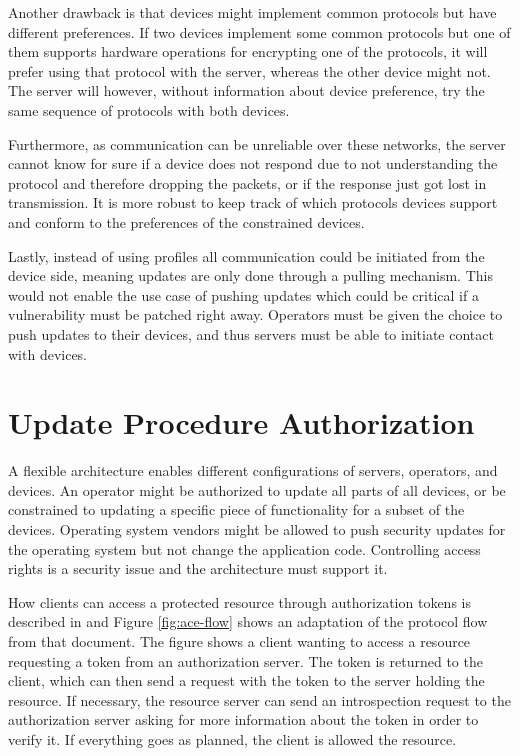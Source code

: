 \documentclass[0-thesis.tex]{subfiles}
\begin{document}
Another drawback is that devices might implement common protocols but have different
preferences. If two devices implement some common protocols but one of them supports
hardware operations for encrypting one of the protocols, it will prefer using that
protocol with the server, whereas the other device might not. The server will however,
without information about device preference, try the same sequence of protocols with both
devices.

Furthermore, as communication can be unreliable over these networks, the server
cannot know for sure if a device does not respond due to not understanding the protocol
and therefore dropping the packets, or if the response just got lost in transmission. It
is more robust to keep track of which protocols devices support and conform to the
preferences of the constrained devices.

Lastly, instead of using profiles all communication could be initiated from the device
side, meaning updates are only done through a pulling mechanism. This would not enable the
use case of pushing updates which could be critical if a vulnerability must be patched
right away. Operators must be given the choice to push updates to their devices, and thus
servers must be able to initiate contact with devices.

\section{Update Procedure Authorization}
\label{sec:authorization}
A flexible architecture enables different configurations of servers, operators, and
devices. An operator might be authorized to update all parts of all devices, or be
constrained to updating a specific piece of functionality for a subset of the devices.
Operating system vendors might be allowed to push security updates for the operating
system but not change the application code. Controlling access rights is a security issue
and the architecture must support it.

How clients can access a protected resource through authorization tokens is described in
\parencite{ace} and Figure \ref{fig:ace-flow} shows an adaptation of the protocol flow
from that document. The figure shows a client wanting to access a resource requesting a
token from an authorization server. The token is returned to the client, which can then
send a request with the token to the server holding the resource. If necessary, the
resource server can send an introspection request to the authorization server asking for
more information about the token in order to verify it. If everything goes as planned, the
client is allowed the resource.
\end{document}
